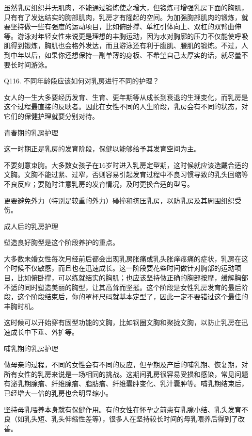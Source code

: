 \documentclass[12pt,UTF8]{ctexbook}
\begin{document}
虽然乳房组织并无肌肉，不能通过锻炼使之增大，但锻炼可增强乳房下面的胸肌，只有有了发达结实的胸部肌肉，乳房才有隆起的空间。为加强胸部肌肉的锻炼，就要坚持做一些有强度的运动项目，比如俯卧撑、单杠引体向上、双杠的双臂曲伸等。游泳对年轻女性来说更是理想的丰胸运动，因为水对胸廓的压力不仅能使呼吸肌得到锻炼，胸肌也会格外发达，而且游泳还有利于腹肌、腰肌的锻炼。不过，人到中年以后，如果你还想保持一副单薄的身板、不希望自己太厚实的话，就尽量不要长时间游泳。





Q116. 不同年龄段应该如何对乳房进行不同的护理？


女人的一生大多要经历发育、生育、更年期等从成长到衰退的生理变化，而乳房是这个过程最直接的反映者。因此在女性不同的人生阶段，乳房会有不同的状态，对它们的保健护理就要分别对待。

青春期的乳房护理

这一时期正是乳房的发育阶段，保健以能够给予其发育空间为主。

不要刻意束胸。大多数女孩子在16岁时进入乳房定型期，这时候就应该选戴合适的文胸。文胸不能过紧、过窄，否则容易引起发育过程中不良习惯导致的乳头回缩等不良反应；要随时注意乳房的发育情况，及时更换合适的型号。

更要避免外力（特别是较重的外力）碰撞和挤压乳房，以防乳房及其周围组织受伤。

成人后的乳房护理

塑造良好胸型是这个阶段养护的重点。

大多数未婚女性每次月经前后都会出现乳房胀痛或乳头胀痒疼痛的症状，乳房在这个时候不仅敏感，而且也在迅速成长。这一阶段要花些时间做针对胸部的运动项目，比如俯卧撑，可以练就结实的胸肌；也应该坚持做正确的胸部按摩，缓解胸部不适的同时塑造美丽的胸型，让其高耸而坚挺。这个阶段是女性乳房发育的最后阶段，这个阶段结束后，你的罩杯尺码就基本定型了，因此一定不要错过这个最佳的丰胸时机。

这时候可以开始穿有固型功能的文胸，比如钢圈文胸和聚拢文胸，以防止乳房在迅速成长中下垂、外扩等。

哺乳期的乳房护理

做母亲的过程，不同的女性会有不同的反应，但孕期及产后的哺乳期、恢复期，对所有女性的乳房来说是一场相同的挑战。这期间乳房很容易受损和感染，常见问题有泌乳期腺瘤、纤维腺瘤、脂肪瘤、纤维囊肿变化、乳汁囊肿等。哺乳期结束后，已经增大一倍的乳房也会明显缩小。

坚持母乳喂养本身就有保健作用。有的女性在怀孕之前患有乳腺小结、乳头发育不良（如乳头短、乳头伸缩性差等），很多人在坚持较长时间的母乳喂养后得到了改善。
\end{document}
